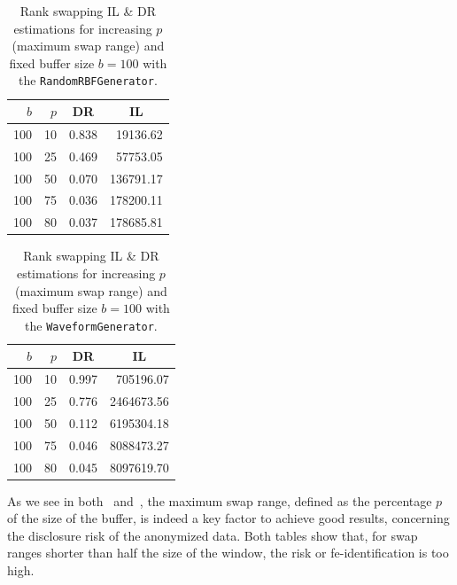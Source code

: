 \begin{minipage}[t]{0.5\textwidth}
	\begin{flushleft}
	\begin{table}[H]
		\centering
		\begin{tabular}{@{}rrrr@{}}
			\toprule
			$b$ & $p$ & \multicolumn{1}{c}{DR} & \multicolumn{1}{c}{IL} \\ \midrule
			100  & 10 & 0.838 & 19136.62  \\
			100  & 25 & 0.469 & 57753.05  \\
			100  & 50 & 0.070 & 136791.17 \\
			100  & 75 & 0.036 & 178200.11 \\
			100  & 80 & 0.037 & 178685.81 \\ \bottomrule
		\end{tabular}
		\caption[Rank swapping DR \& IL estimations (\texttt{RandomRBFGenerator}).]{Rank swapping IL \& DR estimations for increasing $p$ (maximum swap range) and fixed buffer size $b=100$ with the \texttt{RandomRBFGenerator}.}
		\label{table:results-rbf-rankswap}
	\end{table}
	\end{flushleft}
\end{minipage}
\begin{minipage}[t]{0.5\textwidth}
	\begin{flushright}
	\begin{table}[H]
		\centering
		\begin{tabular}{@{}rrrr@{}}
			\toprule
			$b$ & $p$ & \multicolumn{1}{c}{DR} & \multicolumn{1}{c}{IL} \\ \midrule
			100  & 10 & 0.997 & 705196.07  \\
			100  & 25 & 0.776 & 2464673.56 \\
			100  & 50 & 0.112 & 6195304.18 \\
			100  & 75 & 0.046 & 8088473.27 \\
			100  & 80 & 0.045 & 8097619.70 \\ \bottomrule
		\end{tabular}
		\caption[Rank swapping DR \& IL estimations (\texttt{WaveformGenerator}).]{Rank swapping IL \& DR estimations for increasing $p$ (maximum swap range) and fixed buffer size $b=100$ with the \texttt{WaveformGenerator}.}
		\label{table:results-wave-rankswap}
	\end{table}
	\end{flushright}
\end{minipage}

As we see in both~ and~, the maximum swap range, defined as the percentage $p$ of the size of the buffer, is indeed a key factor to achieve good results, concerning the disclosure risk of the anonymized data. Both tables show that, for swap ranges shorter than half the size of the window, the risk or fe-identification is too high.

